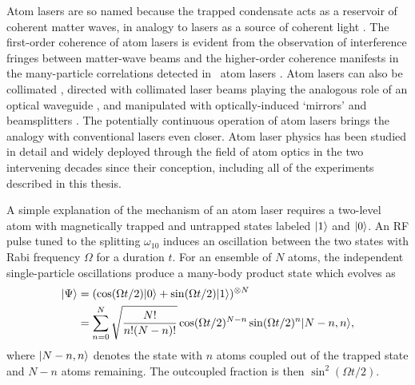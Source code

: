 	Atom lasers are so named because the trapped condensate acts as a reservoir of coherent matter waves, in analogy to lasers as a source of coherent light \cite{Naraschewski99,Glauber63}.
	The first-order coherence of atom lasers is evident from the observation of interference fringes between matter-wave beams \cite{Andrews97} and the higher-order coherence manifests in the many-particle correlations detected in \mhe~atom lasers \cite{Manning10,Dall11a,Rugway11}.
	Atom lasers can also be collimated \cite{Bloch99}, directed with collimated laser beams playing the analogous role of an optical waveguide \cite{Guerin06,Couvert08}, and manipulated with optically-induced `mirrors' and beamsplitters \cite{Bloch01}.
	The potentially continuous operation of atom lasers \cite{Chikkatur02} brings the analogy with conventional lasers even closer.
	Atom laser physics has been studied in detail and widely deployed through the field of atom optics in the two intervening decades since their conception, including all of the experiments described in this thesis.
	


	A simple explanation of the mechanism of an atom laser requires a two-level atom with magnetically trapped and untrapped states labeled $|1\rangle$ and $|0\rangle$.
	An RF pulse tuned to the splitting $\omega_{10}$ induces an oscillation between the two states with Rabi frequency $\Omega$ for a duration $t$.
	For an ensemble of $N$ atoms, the independent single-particle oscillations produce a many-body product state which evolves as \cite{Mewes97}
	\begin{align}
		|\Psi\rangle &= (\cos(\Omega t/2)|0\rangle + \sin(\Omega t/2)|1\rangle)^{\otimes N} \\
		& = \sum_{n=0}^{ N}\sqrt{\frac{N!}{n!(N-n)!}}\cos(\Omega t/2)^{N-n}\sin(\Omega t/2)^n|N-n,n\rangle,
		\label{eqn:PAL_Rabi}
	\end{align}
	where $|N-n,n\rangle$ denotes the state with $n$ atoms coupled out of the trapped state and $N-n$ atoms remaining.
	The outcoupled fraction is then $\sin^2(\Omega t/2)$.

